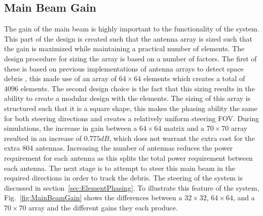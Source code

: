 \documentclass[11pt]{witseiepaper}
\begin{document}
\subsection{Main Beam Gain} \label{sec:MainBeamGain}
The gain of the main beam is highly important to the functionality of the system. This part of the design is created such that the antenna array is sized such that the gain is maximized while maintaining a practical number of elements.
The design procedure for sizing the array is based on a number of factors. The first of these is based on previous implementations of antenna arrays to detect space debris \cite{AMISR}, this made use of an array of $64 \times 64$ elements which creates a total of $4096$ elements.
The second design choice is the fact that this sizing results in the ability to create a modular design with the elements. The sizing of this array is structured such that it is a square shape, this makes the phasing ability the same for both steering directions and creates a relatively uniform steering FOV.
During simulations, the increase in gain between a $64 \times 64$ matrix and a $70 \times 70$ array resulted in an increase of $0.775 dB$, which does not warrant the extra cost for the extra $804$ antennas.
Increasing the number of antennas reduces the power requirement for each antenna as this splits the total power requirement between each antenna.
The next stage is to attempt to steer this main beam in the required directions in order to track the debris. The steering of the system is discussed in section~\ref{sec:ElementPhasing}.
To illustrate this feature of the system, Fig.~\ref{fig:MainBeamGain} shows the differences between a $32 \times 32$, $64 \times 64$, and a $70 \times 70$ array and the different gains they each produce.
\end{document}
